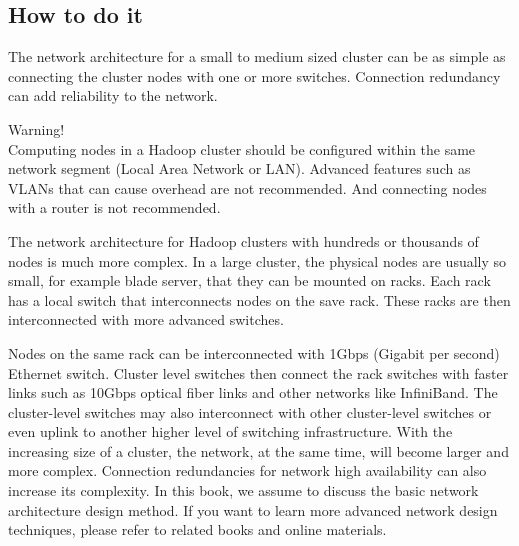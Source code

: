 \subsection*{How to do it}
The network architecture for a small to medium sized cluster can be as simple as connecting the cluster nodes with one or more switches. Connection redundancy can add reliability to the network.
\begin{warning}
Warning! \\
Computing nodes in a Hadoop cluster should be configured within the same network segment (Local Area Network or LAN). Advanced features such as VLANs that can cause overhead are not recommended. And connecting nodes with a router is not recommended.
\end{warning}
The network architecture for Hadoop clusters with hundreds or thousands of nodes is much more complex. In a large cluster, the physical nodes are usually so small, for example blade server, that they can be mounted on racks. Each rack has a local switch that interconnects nodes on the save rack. These racks are then interconnected with more advanced switches.

Nodes on the same rack can be interconnected with 1Gbps (Gigabit per second) Ethernet switch. Cluster level switches then connect the rack switches with faster links such as 10Gbps optical fiber links and other networks like InfiniBand. The cluster-level switches may also interconnect with other cluster-level switches or even uplink to another higher level of switching infrastructure. With the increasing size of a cluster, the network, at the same time, will become larger and more complex. Connection redundancies for network high availability can also increase its complexity. In this book, we assume to discuss the basic network architecture design method. If you want to learn more advanced network design techniques, please refer to related books and online materials.

